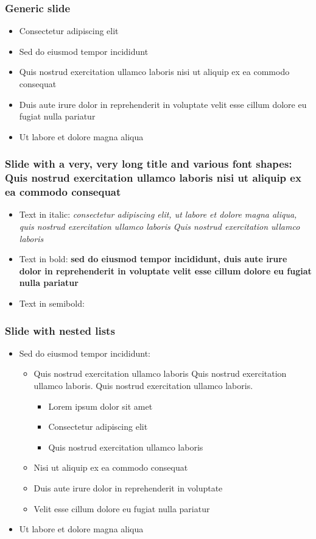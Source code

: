 \begin{frame}
\frametitle{Generic slide}
\begin{itemize}
\item Consectetur adipiscing elit
\item Sed do eiusmod tempor incididunt
\item Quis nostrud exercitation ullamco laboris nisi ut aliquip ex ea commodo consequat
\item Duis aute irure dolor in reprehenderit in voluptate velit esse cillum dolore eu fugiat nulla pariatur
\item Ut labore et dolore magna aliqua
\end{itemize}
\end{frame}

\begin{frame}
\frametitle{Slide with a very, very long title and various font shapes: Quis nostrud exercitation ullamco laboris nisi ut aliquip ex ea commodo consequat}
\begin{itemize}
\item Text in italic: \textit{consectetur adipiscing elit, ut labore et dolore magna aliqua, quis nostrud exercitation ullamco laboris Quis nostrud exercitation ullamco laboris}
\item Text in bold: \textbf{sed do eiusmod tempor incididunt, duis aute irure dolor in reprehenderit in voluptate velit esse cillum dolore eu fugiat nulla pariatur}
\item Text in semibold: 
\end{itemize}
\end{frame}

\begin{frame}
\frametitle{Slide with nested lists}
\begin{itemize}
\item Sed do eiusmod tempor incididunt:
\begin{itemize}
\item Quis nostrud exercitation ullamco laboris Quis nostrud exercitation ullamco laboris. Quis nostrud exercitation ullamco laboris. 
\begin{itemize}
\item Lorem ipsum dolor sit amet
\item Consectetur adipiscing elit
\item Quis nostrud exercitation ullamco laboris
\end{itemize}
\item Nisi ut aliquip ex ea commodo consequat
\item Duis aute irure dolor in reprehenderit in voluptate
\item Velit esse cillum dolore eu fugiat nulla pariatur
\end{itemize}
\item Ut labore et dolore magna aliqua
\end{itemize}
\end{frame}

